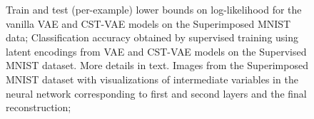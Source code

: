 \begin{figure}[t]
\begin{center}
\;
\;
\vspace{-4mm}
\end{center}
 \caption{\footnotesize
  Train and test (per-example) lower bounds on log-likelihood 
for the vanilla VAE and CST-VAE models on the Superimposed MNIST data;
 Classification accuracy obtained by supervised training using latent encodings
 from VAE and CST-VAE models on the Supervised MNIST dataset.  More details in text.
   Images from the Superimposed MNIST dataset with visualizations of
 intermediate variables in the neural network corresponding to first and second layers and the final reconstruction;
 }
\end{figure}

















